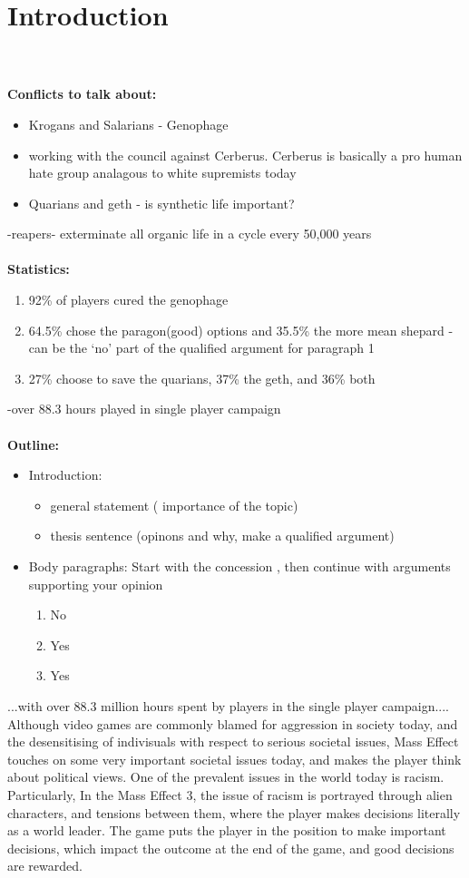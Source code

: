 \documentclass[journal]{IEEEtran}
\begin{document}
\section{Introduction}
\\ \\
\textbf{Conflicts to talk about:}
\begin{itemize}
 \item Krogans and Salarians - Genophage
 \item working with the council against Cerberus. Cerberus is basically a pro human hate group analagous to white supremists today
 \item Quarians and geth - is synthetic life important?
\end{itemize}
-reapers- exterminate all organic life in a cycle every 50,000 years
\\ \\
\textbf{Statistics:}
\begin{enumerate}
 \item 92\% of players cured the genophage
 \item 64.5\% chose the paragon(good) options and 35.5\% the more mean shepard - can be the `no' part of the qualified argument for paragraph 1
 \item 27\% choose to save the quarians, 37\% the geth, and 36\% both
\end{enumerate}
-over 88.3 hours played in single player campaign
\\ \\
\textbf{Outline:}
\begin{itemize}
 \item Introduction:
       \begin{itemize}
        \item general statement ( importance of the topic)
        \item thesis sentence (opinons and why, make a qualified argument)
       \end{itemize}
 \item Body paragraphs: Start with the concession , then continue with arguments supporting your opinion
       \begin{enumerate}
        \item No
        \item Yes
        \item Yes
       \end{enumerate}

\end{itemize}
...with over 88.3 million hours spent by players in the single player campaign.\cite{ea}...
Although video games are commonly blamed for aggression in society today,
and the desensitising of indivisuals with respect to serious societal issues, Mass Effect  touches on some very important societal issues today, and
makes the player think about political views. One of the prevalent issues in the world today is
racism. Particularly, In the Mass Effect 3, the issue of racism is portrayed through alien characters, and
tensions between them, where the player makes decisions literally as a world leader. The game puts the player in the position to
make important decisions, which impact the outcome at the end of the game, and good decisions are rewarded.
\end{document}
